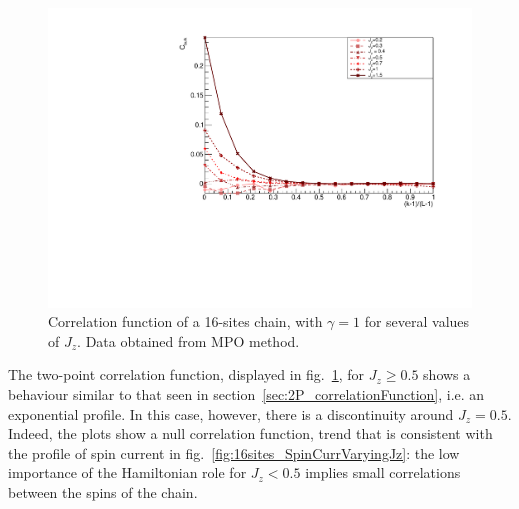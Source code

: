 


\begin{figure}[H]
    \centering
    \includegraphics[scale=0.75]{Figures/16sites/16sites_CFBulkCONNvsJz.pdf}
    \captionsetup{width=1.\linewidth}
    \caption{Correlation function of a 16-sites chain, with $\gamma = 1$ for several values of $J_z$. Data obtained from MPO method.}
    \label{fig:16sites_CFBulkCONNvsJz}
\end{figure}

The two-point correlation function, displayed in fig.~\ref{fig:16sites_CFBulkCONNvsJz}, for $J_z \geq 0.5$ shows a behaviour similar to that seen in section~\ref{sec:2P_correlationFunction}, i.e. an exponential profile. In this case, however, there is a discontinuity around $J_z = 0.5$. Indeed, the plots show a null correlation function, trend that is consistent with the profile of spin current in fig.~\ref{fig:16sites_SpinCurrVaryingJz}: the low importance of the Hamiltonian role for $J_z < 0.5$ implies small correlations between the spins of the chain.

